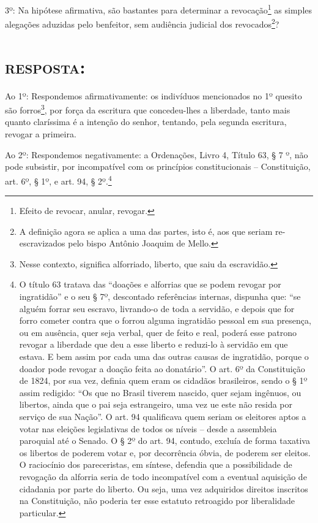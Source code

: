 3º: Na hipótese afirmativa, são bastantes para determinar a
revocação\footnote{Efeito de revocar, anular, revogar.} as simples
alegações aduzidas pelo benfeitor, sem audiência judicial dos
revocados\footnote{A definição agora se aplica a uma das partes, isto
  é, aos que seriam re-escravizados pelo bispo Antônio Joaquim de Mello.}?

\section{\textsc{resposta}:}

Ao 1º: Respondemos afirmativamente: os indivíduos mencionados no 1º
quesito são forros\footnote{Nesse contexto, significa alforriado,
  liberto, que saiu da escravidão.}, por força da escritura que
concedeu-lhes a liberdade, tanto mais quanto claríssima é a intenção do
senhor, tentando, pela segunda escritura, revogar a primeira.

Ao 2º: Respondemos negativamente: a Ordenações, Livro 4,
Título 63, § 7 º, não pode subsistir, por incompatível com os
princípios constitucionais -- Constituição, art. 6º, § 1º, e art.
94, § 2º.\footnote{O título 63 tratava das ``doações e alforrias que se
  podem revogar por ingratidão'' e o seu § 7º, descontado referências
  internas, dispunha que: ``se alguém forrar seu escravo, livrando-o de
  toda a servidão, e depois que for forro cometer contra que o forrou
  alguma ingratidão pessoal em sua presença, ou em ausência, quer seja
  verbal, quer de feito e real, poderá esse patrono revogar a liberdade
  que deu a esse liberto e reduzi-lo à servidão em que estava. E bem
  assim por cada uma das outras causas de ingratidão, porque o doador
  pode revogar a doação feita ao donatário''. O art. 6º da Constituição
  de 1824, por sua vez, definia quem eram os cidadãos brasileiros, sendo
  o § 1º assim redigido: ``Os que no Brasil tiverem nascido, quer sejam
  ingênuos, ou libertos, ainda que o pai seja estrangeiro, uma vez ue
  este não resida por serviço de sua Nação''. O art. 94 qualificava quem
  seriam os eleitores aptos a votar nas eleições legislativas de todos
  os níveis -- desde a assembleia paroquial até o Senado. O § 2º do art.
  94, contudo, excluía de forma taxativa os libertos de poderem votar e,
  por decorrência óbvia, de poderem ser eleitos. O raciocínio dos
  pareceristas, em síntese, defendia que a possibilidade de revogação da
  alforria seria de todo incompatível com a eventual aquisição de
  cidadania por parte do liberto. Ou seja, uma vez adquiridos direitos
  inscritos na Constituição, não poderia ter esse estatuto retroagido
  por liberalidade particular.}

